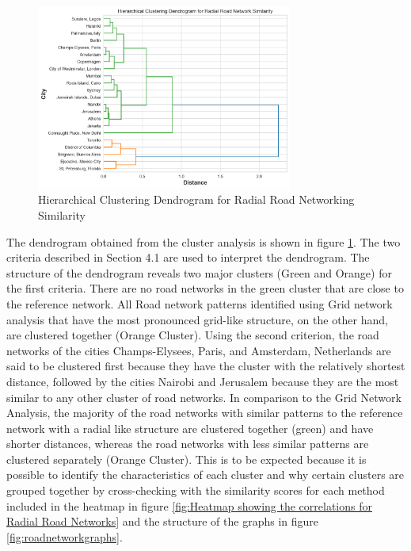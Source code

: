 \begin{figure}[!ht]
\centering
\includegraphics[width=0.75\textwidth,center]{picture/Radial/radial_dendrogram2.png}
\caption[Hierarchical Clustering Dendrogram for Radial Road Networking Similarity]{Hierarchical Clustering Dendrogram for Radial Road Networking Similarity}
\label{fig:Hierarchical Clustering Dendrogram for Radial Road Networking Similarity}
\end{figure}

The dendrogram obtained from the cluster analysis is shown in figure \ref{fig:Hierarchical Clustering Dendrogram for Radial Road Networking Similarity}. The two criteria described in Section 4.1 are used to interpret the dendrogram. The structure of the dendrogram reveals two major clusters (Green and Orange) for the first criteria. There are no road networks in the green cluster that are close to the reference network. All Road network patterns identified using Grid network analysis that have the most pronounced grid-like structure, on the other hand, are clustered together (Orange Cluster). Using the second criterion, the road networks of the cities Champs-Elysees, Paris, and Amsterdam, Netherlands are said to be clustered first because they have the cluster with the relatively shortest distance, followed by the cities Nairobi and Jerusalem because they are the most similar to any other cluster of road networks.
In comparison to the Grid Network Analysis, the majority of the road networks with similar patterns to the reference network with a radial like structure are clustered together (green) and have shorter distances, whereas the road networks with less similar patterns are clustered separately (Orange Cluster). This is to be expected because it is possible to identify the characteristics of each cluster and why certain clusters are grouped together by cross-checking with the similarity scores for each method included in the heatmap in figure \ref{fig:Heatmap showing the correlations for Radial Road Networks} and the structure of the graphs in figure \ref{fig:roadnetworkgraphs}.

